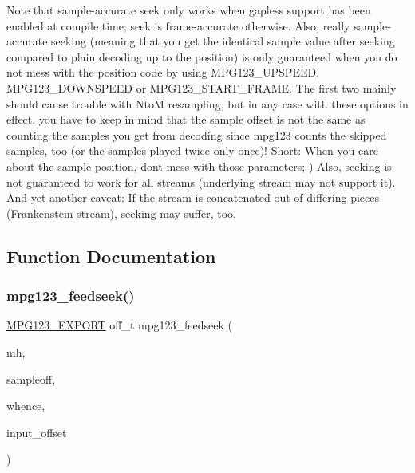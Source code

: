 Note that sample-\/accurate seek only works when gapless support has been enabled at compile time; seek is frame-\/accurate otherwise. Also, really sample-\/accurate seeking (meaning that you get the identical sample value after seeking compared to plain decoding up to the position) is only guaranteed when you do not mess with the position code by using M\+P\+G123\+\_\+\+U\+P\+S\+P\+E\+ED, M\+P\+G123\+\_\+\+D\+O\+W\+N\+S\+P\+E\+ED or M\+P\+G123\+\_\+\+S\+T\+A\+R\+T\+\_\+\+F\+R\+A\+ME. The first two mainly should cause trouble with NtoM resampling, but in any case with these options in effect, you have to keep in mind that the sample offset is not the same as counting the samples you get from decoding since mpg123 counts the skipped samples, too (or the samples played twice only once)! Short\+: When you care about the sample position, don\textquotesingle{}t mess with those parameters;-\/) Also, seeking is not guaranteed to work for all streams (underlying stream may not support it). And yet another caveat\+: If the stream is concatenated out of differing pieces (Frankenstein stream), seeking may suffer, too. 

\subsection{Function Documentation}
\mbox{\label{group__mpg123__seek_gab0b0e6ed9e4ba14f1ca0c1dd83be6f57}} 
\subsubsection{\texorpdfstring{mpg123\_feedseek()}{mpg123\_feedseek()}}
{\footnotesize\ttfamily \mbox{\hyperlink{mpg123_8h_a2ba98cfba3f760879df70e755b2a61cc}{M\+P\+G123\+\_\+\+E\+X\+P\+O\+RT}} off\+\_\+t mpg123\+\_\+feedseek (\begin{DoxyParamCaption}\item[{\mbox{\hyperlink{group__mpg123__init_ga6728e2839a395f3a07d4514da659faca}{mpg123\+\_\+handle}} $\ast$}]{mh,  }\item[{off\+\_\+t}]{sampleoff,  }\item[{int}]{whence,  }\item[{off\+\_\+t $\ast$}]{input\+\_\+offset }\end{DoxyParamCaption})}

